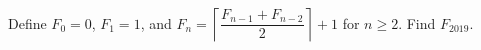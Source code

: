 Define $F_0=0$, $F_1=1$, and $F_n=\left\lceil\dfrac{F_{n-1}+F_{n-2}}{2}\right\rceil+1$ for $n\ge2$. Find $F_{2019}$.
